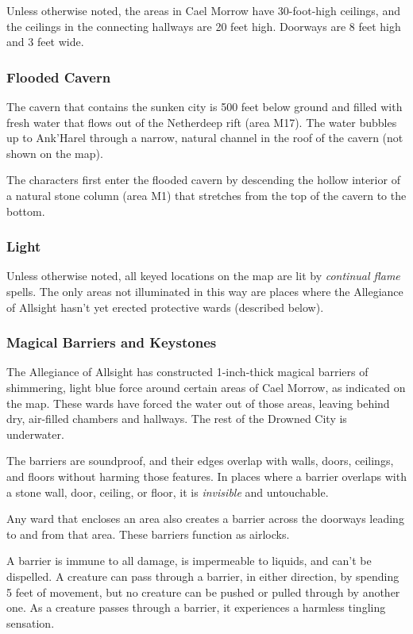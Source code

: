 \documentclass[letterpaper, 11pt, bg=full, twocolumn]{dndbook}
\begin{document}
Unless otherwise noted, the areas in Cael Morrow have 30-foot-high ceilings, and the ceilings in the connecting hallways are 20 feet high. Doorways are 8 feet high and 3 feet wide.

\subsubsection{Flooded Cavern}

The cavern that contains the sunken city is 500 feet below ground and filled with fresh water that flows out of the Netherdeep rift (area M17). The water bubbles up to Ank'Harel through a narrow, natural channel in the roof of the cavern (not shown on the map).

The characters first enter the flooded cavern by descending the hollow interior of a natural stone column (area M1) that stretches from the top of the cavern to the bottom.

\subsubsection{Light}

Unless otherwise noted, all keyed locations on the map are lit by \textit{continual flame} spells. The only areas not illuminated in this way are places where the Allegiance of Allsight hasn't yet erected protective wards (described below).

\subsubsection{Magical Barriers and Keystones}

The Allegiance of Allsight has constructed 1-inch-thick magical barriers of shimmering, light blue force around certain areas of Cael Morrow, as indicated on the map. These wards have forced the water out of those areas, leaving behind dry, air-filled chambers and hallways. The rest of the Drowned City is underwater.

The barriers are soundproof, and their edges overlap with walls, doors, ceilings, and floors without harming those features. In places where a barrier overlaps with a stone wall, door, ceiling, or floor, it is \textit{invisible} and untouchable.

Any ward that encloses an area also creates a barrier across the doorways leading to and from that area. These barriers function as airlocks.

A barrier is immune to all damage, is impermeable to liquids, and can't be dispelled. A creature can pass through a barrier, in either direction, by spending 5 feet of movement, but no creature can be pushed or pulled through by another one. As a creature passes through a barrier, it experiences a harmless tingling sensation.
\end{document}
